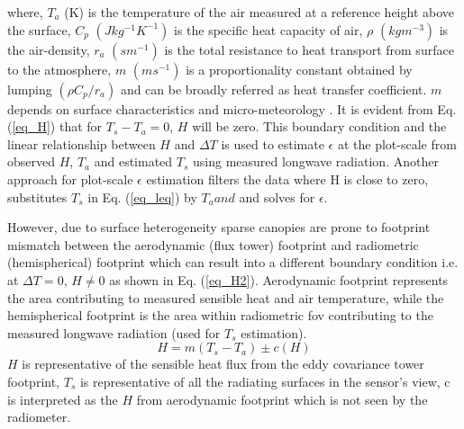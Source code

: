 \documentclass[fleqn,10pt]{wlscirep}
\begin{document}
where, $T_{a}$ (K) is the temperature of the air measured at a reference height above the surface, $C_{p}$ $(J kg^{-1} K^{-1})$ is the specific heat capacity of air, $\rho$ $(kgm^{-3})$ is the air-density, $r_{a}$ $(s m^{-1})$ is the total resistance to heat transport from surface to the atmosphere, $m$ $(ms^{-1})$ is a proportionality constant obtained by lumping $(\rho C_{p}/r_{a})$ and can be broadly referred as heat transfer coefficient. $m$ depends on surface characteristics and micro-meteorology \cite{lhomme_radiative_1988}. It is evident from Eq. (\ref{eq_H}) that for $T_{s} - T_{a} = 0$, $H$ will be zero. This boundary condition and the linear relationship  between $H$ and $\Delta T $ is used to estimate $\epsilon$ at the plot-scale from observed $H$, $T_a$ and estimated $T_{s}$ using measured longwave radiation\cite{holmes_land_2009,holmes_cloud_2016-1}. Another approach for plot-scale $\epsilon$ estimation filters the data where H is close to zero, substitutes $T_{s}$ in Eq. (\ref{eq_leq}) by $T_{a} and $ and solves for $\epsilon$\cite{maes2019potential}. %

However, due to surface heterogeneity sparse canopies are prone to footprint mismatch between the aerodynamic (flux tower) footprint and radiometric (hemispherical) footprint \cite{chu2021representativeness,marcolla2018geometry,morillas2013using} which can result into a different boundary condition i.e. at $\Delta T =0$, $H \not= 0$ as shown in Eq. (\ref{eq_H2}). Aerodynamic footprint represents the area contributing to measured sensible heat and air temperature, while the hemispherical footprint is the area within radiometric fov contributing to the measured longwave radiation (used for $T_{s}$ estimation).
\begin{equation}\label{eq_H2}
H= m(T_{s} - T_{a}) \pm  c(H)
\end{equation}
$H$ is representative of the sensible heat flux from the eddy covariance tower footprint, $T_{s}$ is representative of all the radiating surfaces in the sensor’s view, c is interpreted as the $H$ from aerodynamic footprint which is not seen by the radiometer. 
\end{document}
